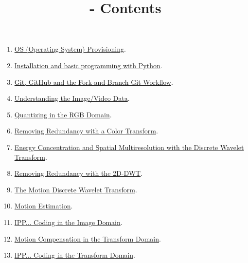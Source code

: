 
\title{\SM - Contents}

\maketitle

\begin{enumerate}
\item \href{https://sistemas-multimedia.github.io/milestones/01-provisioning/}{OS (Operating System) Provisioning}.
\item \href{https://sistemas-multimedia.github.io/milestones/02-python/}{Installation and basic programming with Python}.
\item \href{https://sistemas-multimedia.github.io/milestones/03-git/}{Git, GitHub and the Fork-and-Branch Git Workflow}.
\item \href{https://sistemas-multimedia.github.io/milestones/04-the_data/}{Understanding the Image/Video Data}.
\item \href{https://sistemas-multimedia.github.io/milestones/05-quantization/}{Quantizing in the RGB Domain}.
\item \href{https://sistemas-multimedia.github.io/milestones/06-color_transform/}{Removing Redundancy with a Color Transform}.
\item \href{https://sistemas-multimedia.github.io/milestones/07-DWT/}{Energy Concentration and Spatial Multiresolution with the Discrete Wavelet Transform}.
\item \href{https://sistemas-multimedia.github.io/milestones/08-2D-DWT/}{Removing Redundancy with the 2D-DWT}.
\item \href{https://sistemas-multimedia.github.io/milestones/09-MDWT/}{The Motion Discrete Wavelet Transform}.
\item \href{https://sistemas-multimedia.github.io/milestones/10-ME/}{Motion Estimation}.
\item \href{https://sistemas-multimedia.github.io/milestones/11-image_domain_IPP/}{IPP... Coding in the Image Domain}.
\item \href{https://sistemas-multimedia.github.io/milestones/12-transform_domain_MC/}{Motion Compensation in the Transform Domain}.
\item \href{https://sistemas-multimedia.github.io/milestones/13-transform_domain_IPP/}{IPP... Coding in the Transform Domain}.

\end{enumerate}
